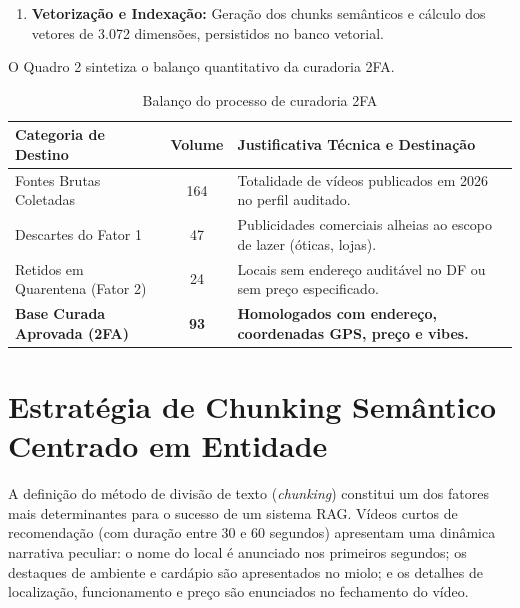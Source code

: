 \documentclass[12pt,a4paper]{article}
\begin{document}
\begin{enumerate}[label=\alph*)]
\begin{itemize}
\item \textit{Trava 2 (Orçamento Objetivo):} Exigência de valor monetário médio explícito por pessoa (em Reais) e enquadramento em faixa de custo (Barato, Moderado ou Caro).
\end{itemize}
Os registros que falharam em qualquer uma das duas travas (24 vídeos com ausência de preço exato ou sem endereço pontual) foram encaminhados à fila de quarentena (\textit{data/fila\_quarentena\_2fa.json}). Os 93 estabelecimentos aprovados simultaneamente em ambos os fatores integraram a base oficial (\textit{data/banco\_aprovado\_2fa.json}).
\item \textbf{Vetorização e Indexação:} Geração dos chunks semânticos e cálculo dos vetores de 3.072 dimensões, persistidos no banco vetorial.
\end{enumerate}

O Quadro 2 sintetiza o balanço quantitativo da curadoria 2FA.

\begin{table}[H]
\centering
\small
\renewcommand{\arraystretch}{1.15}
\caption{Balanço do processo de curadoria 2FA}
\begin{tabularx}{\textwidth}{X c p{7.5cm}}
\toprule
\textbf{Categoria de Destino} & \textbf{Volume} & \textbf{Justificativa Técnica e Destinação} \\
\midrule
Fontes Brutas Coletadas & 164 & Totalidade de vídeos publicados em 2026 no perfil auditado. \\
Descartes do Fator 1 & 47 & Publicidades comerciais alheias ao escopo de lazer (óticas, lojas). \\
Retidos em Quarentena (Fator 2) & 24 & Locais sem endereço auditável no DF ou sem preço especificado. \\
\textbf{Base Curada Aprovada (2FA)} & \textbf{93} & \textbf{Homologados com endereço, coordenadas GPS, preço e vibes.} \\
\bottomrule
\end{tabularx}
\vspace{0.1cm}
\end{table}

\section{Estratégia de Chunking Semântico Centrado em Entidade}

A definição do método de divisão de texto (\textit{chunking}) constitui um dos fatores mais determinantes para o sucesso de um sistema RAG. Vídeos curtos de recomendação (com duração entre 30 e 60 segundos) apresentam uma dinâmica narrativa peculiar: o nome do local é anunciado nos primeiros segundos; os destaques de ambiente e cardápio são apresentados no miolo; e os detalhes de localização, funcionamento e preço são enunciados no fechamento do vídeo.
\end{document}
